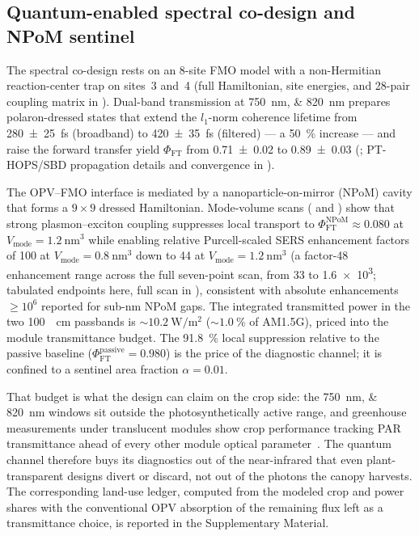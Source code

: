 \documentclass[preprint,12pt]{elsarticle}
\begin{document}
\subsection{Quantum-enabled spectral co-design and NPoM sentinel}\label{sec:sentinel}

The spectral co-design rests on an 8-site FMO model with a non-Hermitian reaction-center trap on sites~3 and~4 (full Hamiltonian, site energies, and 28-pair coupling matrix in ). Dual-band transmission at \qtylist{750;820}{\nm} prepares polaron-dressed states that extend the $l_1$-norm coherence lifetime from \qty{280(25)}{\fs} (broadband) to \qty{420(35)}{\fs} (filtered) --- a \qty{50}{\percent} increase --- and raise the forward transfer yield $\Phi_{\mathrm{FT}}$ from \num{0.71(2)} to \num{0.89(3)} (; PT-HOPS/SBD propagation details and convergence in ).

The OPV--FMO interface is mediated by a nanoparticle-on-mirror (NPoM) cavity that forms a $9\times 9$ dressed Hamiltonian. Mode-volume scans ( and ) show that strong plasmon--exciton coupling suppresses local transport to $\Phi_{\mathrm{FT}}^{\mathrm{NPoM}} \approx 0.080$ at $V_{\mathrm{mode}} = \qty{1.2}{\nm\cubed}$ while enabling relative Purcell-scaled SERS enhancement factors of \num{100} at $V_{\mathrm{mode}} = \qty{0.8}{\nm\cubed}$ down to \num{44} at $V_{\mathrm{mode}} = \qty{1.2}{\nm\cubed}$ (a factor-\num{48} enhancement range across the full seven-point scan, from \num{33} to \num{1.6e3}; tabulated endpoints here, full scan in ), consistent with absolute enhancements $\geq 10^6$ reported for sub-nm NPoM gaps. The integrated transmitted power in the two \qty{100}{\per\cm} passbands is $\sim\qty{10.2}{\W\per\m\squared}$ ($\sim\qty{1.0}{\percent}$ of AM1.5G), priced into the module transmittance budget. The \qty{91.8}{\percent} local suppression relative to the passive baseline ($\Phi_{\mathrm{FT}}^{\mathrm{passive}} = 0.980$) is the price of the diagnostic channel; it is confined to a sentinel area fraction $\alpha = 0.01$.

That budget is what the design can claim on the crop side: the \qtylist{750;820}{\nm} windows sit outside the photosynthetically active range, and greenhouse measurements under translucent modules show crop performance tracking PAR transmittance ahead of every other module optical parameter~\cite{Stallknecht2023}. The quantum channel therefore buys its diagnostics out of the near-infrared that even plant-transparent designs divert or discard, not out of the photons the canopy harvests. The corresponding land-use ledger, computed from the modeled crop and power shares with the conventional OPV absorption of the remaining flux left as a transmittance choice, is reported in the Supplementary Material.
\end{document}
